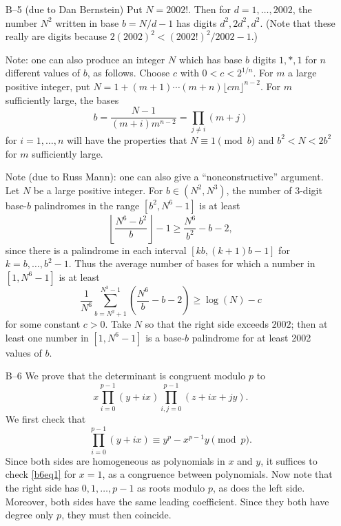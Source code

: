 \documentclass[amssymb,twocolumn,pra,10pt,aps]{revtex4-1}
\begin{document}
\begin{itemize}
\item[B--5]
(due to Dan Bernstein)
Put $N = 2002!$. Then for $d=1, \dots, 2002$,
the number $N^2$ written in base $b = N/d - 1$ has digits
$d^2, 2d^2, d^2$. (Note that these really are digits because
$2(2002)^2 < (2002!)^2/2002 - 1$.)

Note: one can also produce an integer $N$ which has base $b$
digits $1, *, 1$ for $n$ different values of $b$, as follows.
Choose $c$ with $0 < c < 2^{1/n}$. For $m$ a large positive integer,
put $N = 1 + (m+1)\cdots (m+n)\lfloor cm \rfloor^{n-2}$.
For $m$ sufficiently large, the bases
\[
b = \frac{N-1}{(m+i)m^{n-2}} = \prod_{j \neq i} (m+j)
\]
for $i=1, \dots, n$ will
have the properties that $N \equiv 1 \pmod{b}$ and $b^2 < N < 2b^2$
for $m$ sufficiently large.

Note (due to Russ Mann):
one can also give a ``nonconstructive'' argument. Let $N$ be a
large positive integer. For $b \in (N^2, N^3)$, the number of 3-digit
base-$b$ palindromes in the range $[b^2, N^6 - 1]$ is at least
\[
\left\lfloor \frac{N^6 - b^2}{b} \right\rfloor - 1
\geq \frac{N^6}{b^2} - b - 2,
\]
since there is a palindrome in each interval $[kb, (k+1)b-1]$ for
$k=b, \dots, b^2-1$. Thus the average number of bases for which
a number in $[1, N^6-1]$ is at least
\[
\frac{1}{N^6} \sum_{b=N^2+1}^{N^3-1} \left( \frac{N^6}{b} - b-2 \right)
\geq  \log(N) - c
\]
for some constant $c>0$. Take $N$ so that the right side exceeds $2002$;
then at least one number in $[1, N^6-1]$ is a base-$b$ palindrome
for at least 2002 values of $b$.

\item[B--6]
We prove that the determinant is congruent modulo $p$ to
\begin{equation} \label{b6eq2}
x \prod_{i=0}^{p-1} (y+ix) \prod_{i,j=0}^{p-1} (z + ix + jy).
\end{equation}
We first check that
\begin{equation} \label{b6eq1}
\prod_{i=0}^{p-1} (y+ix) \equiv y^p - x^{p-1} y \pmod{p}.
\end{equation}
Since both sides are homogeneous as polynomials in $x$ and $y$,
it suffices to check \eqref{b6eq1}
for $x=1$, as a congruence between polynomials. Now note that
the right side has $0,1,\dots,p-1$ as roots modulo $p$, as does
the left side. Moreover, both sides have the same leading coefficient.
Since they both have degree only $p$, they must then coincide.


\end{itemize}
\end{document}
